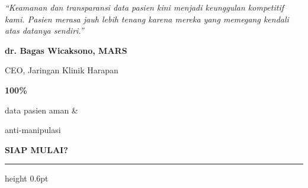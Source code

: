 \documentclass[a4paper]{article}
\newcommand{\sectiontitle}[1]{%
    \vspace{10pt}%
    {\fontsize{13}{16}\selectfont\bfseries\color{BlueDark} #1}\par\vspace{3pt}%
    {\color{BluePrimary}\hrule height 0.6pt}\par\vspace{8pt}%
}
\begin{document}
\noindent
\begin{minipage}[t]{0.485\textwidth}
    \colorbox{BlueBg}{%
        \begin{minipage}{\dimexpr\linewidth-2\fboxsep\relax}
            {\fontsize{9.5}{13}\selectfont\color{TextDark}\textit{``Keamanan dan transparansi data pasien kini menjadi keunggulan kompetitif kami. Pasien merasa jauh lebih tenang karena mereka yang memegang kendali atas datanya sendiri.''}}\par\vspace{4pt}
            {\fontsize{8.5}{11}\selectfont\bfseries\color{BluePrimary} dr. Bagas Wicaksono, MARS}\par
            {\fontsize{8}{10}\selectfont\color{TextLight} CEO, Jaringan Klinik Harapan}
        \end{minipage}}
\end{minipage}%
\hfill
\begin{minipage}[t]{0.485\textwidth}
    \colorbox{BlueBg}{%
        \begin{minipage}{\dimexpr\linewidth-2\fboxsep\relax}
            \begin{center}
                {\fontsize{20}{24}\selectfont\bfseries\color{BluePrimary} 100\%}\par
                {\fontsize{9.5}{12}\selectfont\color{TextDark} data pasien aman \&}\par
                {\fontsize{9.5}{12}\selectfont\color{TextDark} anti-manipulasi}
            \end{center}
        \end{minipage}}
\end{minipage}

\sectiontitle{SIAP MULAI?}
\end{document}
